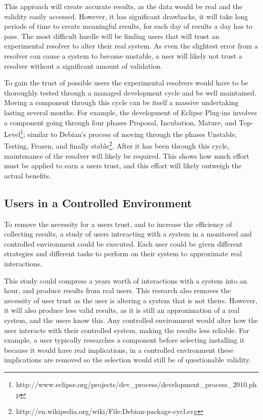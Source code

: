 This approach will create accurate results, as the data would be real and the validity easily accessed. 
However, it has significant drawbacks,
it will take long periods of time to create meaningful results, for each day of results a day has to pass.
The most difficult hurdle will be finding users that will trust an experimental resolver to alter their real system.   
As even the slightest error from a resolver can cause a system to become unstable, a user will likely not trust a resolver without a significant amount of validation.

To gain the trust of possible users the experimental resolvers would have to be thoroughly tested through a managed development cycle and be well maintained.
Moving a component through this cycle can be itself a massive undertaking lasting several months. 
For example, the development of Eclipse Plug-ins involves a component going through four phases 
Proposal, Incubation, Mature, and Top-Level\footnote{http://www.eclipse.org/projects/dev\_process/development\_process\_2010.php};
similar to Debian's process of moving through the phases Unstable, Testing, Frozen, and finally stable\footnote{http://en.wikipedia.org/wiki/File:Debian-package-cycl.svg}.
After it has been through this cycle, maintenance of the resolver will likely be required.
This shows how much effort must be applied to earn a users trust, and this effort will likely outweigh the actual benefits.

\subsection{Users in a Controlled Environment}
To remove the necessity for a users trust, and to increase the efficiency of collecting results, 
a study of users interacting with a system in a monitored and controlled environment could be executed.
Each user could be given different strategies and different tasks to perform on their system to approximate real interactions.

This study could compress a years worth of interactions with a system into an hour, and produce results from real users. 
This research also removes the necessity of user trust as the user is altering a system that is not theirs.
However, it will also produce less valid results, as it is still an approximation of a real system, and the users know this.
Any controlled environment would alter how the user interacts with their controlled system, making the results less reliable.
For example, a user typically researches a component before selecting installing it because it would have real implications, 
in a controlled environment these implications are removed so the selection would still be of questionable validity.

